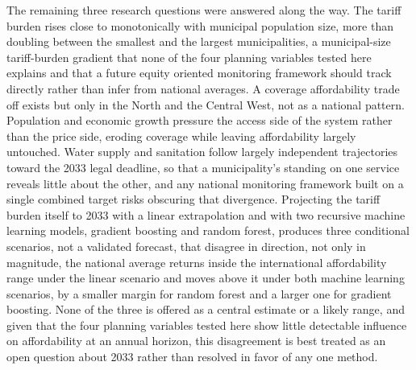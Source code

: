 \documentclass[pdflatex,sn-mathphys-num]{sn-jnl}%
\theoremstyle{thmstyleone}%
\theoremstyle{thmstyletwo}%
\theoremstyle{thmstylethree}%
\begin{document}
The remaining three research questions were answered along the way. The tariff burden rises close to monotonically with municipal population size, more than doubling between the smallest and the largest municipalities, a municipal-size tariff-burden gradient that none of the four planning variables tested here explains and that a future equity oriented monitoring framework should track directly rather than infer from national averages. A coverage affordability trade off exists but only in the North and the Central West, not as a national pattern. Population and economic growth pressure the access side of the system rather than the price side, eroding coverage while leaving affordability largely untouched. Water supply and sanitation follow largely independent trajectories toward the 2033 legal deadline, so that a municipality's standing on one service reveals little about the other, and any national monitoring framework built on a single combined target risks obscuring that divergence. Projecting the tariff burden itself to 2033 with a linear extrapolation and with two recursive machine learning models, gradient boosting and random forest, produces three conditional scenarios, not a validated forecast, that disagree in direction, not only in magnitude, the national average returns inside the international affordability range under the linear scenario and moves above it under both machine learning scenarios, by a smaller margin for random forest and a larger one for gradient boosting. None of the three is offered as a central estimate or a likely range, and given that the four planning variables tested here show little detectable influence on affordability at an annual horizon, this disagreement is best treated as an open question about 2033 rather than resolved in favor of any one method.
\end{document}
